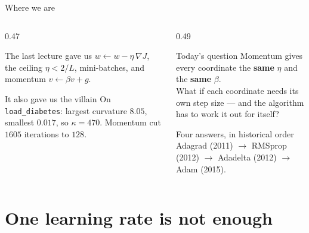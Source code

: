 \documentclass[aspectratio=169]{beamer}
\begin{document}
\begin{frame}[shrink=5]{Where we are}
  \begin{columns}[T]
    \begin{column}{0.47\textwidth}
      \begin{block}{The last lecture gave us}
        $w \leftarrow w - \eta\,\nabla J$, the ceiling $\eta < 2/L$, mini-batches,
        and momentum $v \leftarrow \beta v + g$.
      \end{block}
      \begin{block}{It also gave us the villain}
        On \texttt{load\_diabetes}: largest curvature $8.05$, smallest $0.017$,
        so $\kappa = 470$. Momentum cut $1605$ iterations to $128$.
      \end{block}
    \end{column}
    \begin{column}{0.49\textwidth}
      \begin{exampleblock}{Today's question}
        Momentum gives every coordinate the \textbf{same} $\eta$ and the
        \textbf{same} $\beta$.\\[0.3em]
        What if each coordinate needs its own step size --- and the algorithm
        has to work it out for itself?
      \end{exampleblock}
      \begin{alertblock}{Four answers, in historical order}
        Adagrad (2011) $\rightarrow$ RMSprop (2012) $\rightarrow$
        Adadelta (2012) $\rightarrow$ Adam (2015).
      \end{alertblock}
    \end{column}
  \end{columns}
\end{frame}

\section[One rate]{One learning rate is not enough}
\label{sec:why}
\end{document}

